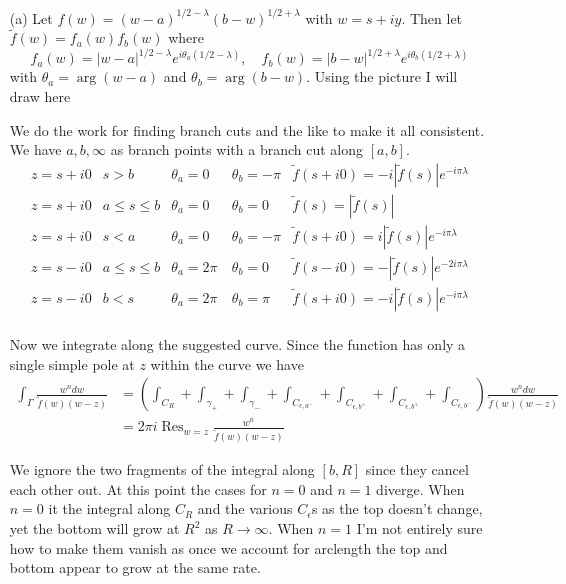 \documentclass[10pt]{article}
\newcommand{\wt}[1]{\widetilde{#1}}
\DeclareMathOperator{\res}{Res}
\theoremstyle{plain}
\theoremstyle{remark}
\begin{document}
\begin{enumerate}
\item[(a)] Let $f(w)=(w-a)^{1/2-\lambda}(b-w)^{1/2+\lambda}$ with $w=s+iy$. Then let $\wt{f}(w)=f_a(w)f_b(w)$
  where
  \[
    f_a(w)=|w-a|^{1/2-\lambda}e^{i\theta_a(1/2-\lambda)},\quad f_b(w)=|b-w|^{1/2+\lambda}e^{i\theta_b(1/2+\lambda)}
  \]
  with $\theta_a=\arg(w-a)$ and $\theta_b=\arg(b-w)$. Using the picture I will draw here

  \vskip2in

  We do the work for finding branch cuts and the like to make it all consistent.
  We have $a,b,\infty$ as branch points with a branch cut along $[a,b]$.
  \begin{align*}
    z=s+i0 & s>b & \theta_a=0\ & \theta_b =-\pi & \wt{f}(s+i0)=-i|\wt{f}(s)|e^{-i\pi\lambda}\\
    z=s+i0 & a\leq s\leq b & \theta_a=0\ & \theta_b =0 & \wt{f}(s)=|\wt{f}(s)|\\
    z=s+i0 & s<a & \theta_a=0\ & \theta_b =-\pi & \wt{f}(s+i0)=i|\wt{f}(s)|e^{-i\pi\lambda}\\
    z=s-i0 & a\leq s\leq b & \theta_a=2\pi\ & \theta_b =0 & \wt{f}(s-i0)=-|\wt{f}(s)|e^{-2i\pi\lambda}\\
    z=s-i0 & b<s & \theta_a=2\pi\ & \theta_b =\pi & \wt{f}(s+i0)=-i|\wt{f}(s)|e^{-i\pi\lambda}\\
  \end{align*}
  
  Now we integrate along the suggested curve. Since the function has only a single
  simple pole at $z$ within the curve we have
  \begin{align*}
    \int_\Gamma \frac{w^n dw}{\wt{f}(w)(w-z)}&=\left(\int_{C_R}+\int_{\gamma_+}+\int_{\gamma_-}+\int_{C_{\epsilon,a^-}}+\int_{C_{\epsilon,b^+}}+\int_{C_{\epsilon,b^+}}+\int_{C_{\epsilon,b^-}}\right)\frac{w^n dw}{\wt{f}(w)(w-z)}\\
                                    &=2\pi i\res_{w=z}\frac{w^n }{\wt{f}(w)(w-z)}    
  \end{align*}

  We ignore the two fragments of the integral along $[b,R]$ since they cancel each other out.
  At this point the cases for $n=0$ and $n=1$ diverge.
  When $n=0$ it the integral along $C_R$ and the various $C_{\epsilon}$s as the top doesn't
  change, yet the bottom will grow at $R^2$ as $R\rightarrow\infty$. When $n=1$ I'm not entirely sure
  how to make them vanish as once we account for arclength the top and bottom appear
  to grow at the same rate.


\end{enumerate}
\end{document}
